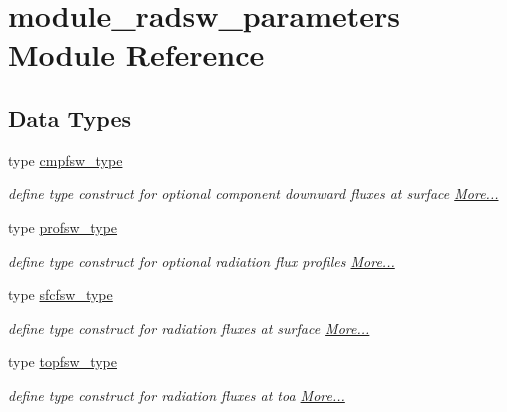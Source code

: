 \hypertarget{namespacemodule__radsw__parameters}{}\section{module\+\_\+radsw\+\_\+parameters Module Reference}
\label{namespacemodule__radsw__parameters}
\subsection*{Data Types}
\begin{DoxyCompactItemize}
\item 
type \hyperlink{group__module__radsw__main_structmodule__radsw__parameters_1_1cmpfsw__type}{cmpfsw\+\_\+type}
\begin{DoxyCompactList}\small\item\em define type construct for optional component downward fluxes at surface  \hyperlink{group__module__radsw__main_structmodule__radsw__parameters_1_1cmpfsw__type}{More...}\end{DoxyCompactList}\item 
type \hyperlink{group__module__radsw__main_structmodule__radsw__parameters_1_1profsw__type}{profsw\+\_\+type}
\begin{DoxyCompactList}\small\item\em define type construct for optional radiation flux profiles  \hyperlink{group__module__radsw__main_structmodule__radsw__parameters_1_1profsw__type}{More...}\end{DoxyCompactList}\item 
type \hyperlink{group__module__radsw__main_structmodule__radsw__parameters_1_1sfcfsw__type}{sfcfsw\+\_\+type}
\begin{DoxyCompactList}\small\item\em define type construct for radiation fluxes at surface  \hyperlink{group__module__radsw__main_structmodule__radsw__parameters_1_1sfcfsw__type}{More...}\end{DoxyCompactList}\item 
type \hyperlink{namespacemodule__radsw__parameters_structmodule__radsw__parameters_1_1topfsw__type}{topfsw\+\_\+type}
\begin{DoxyCompactList}\small\item\em define type construct for radiation fluxes at toa  \hyperlink{namespacemodule__radsw__parameters_structmodule__radsw__parameters_1_1topfsw__type}{More...}\end{DoxyCompactList}\end{DoxyCompactItemize}
